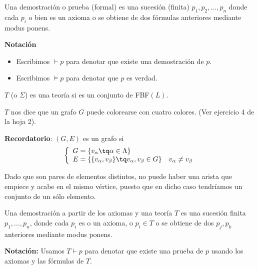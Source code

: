\begin{defn}
	Una demostración o prueba (formal) es una sucesión (finita) $p_1, p_2, \hdots, p_n$ donde cada $p_i$ o bien es un axioma o se obtiene de dos fórmulas anteriores mediante modus ponens.
\end{defn}

\begin{mdframed}
\textbf{Notación}
\begin{itemize}
	\vspace{-3mm}
	\item Escribimos $\vdash p$ para denotar que existe una demostración de $p$.
	\item Escribimos $\vDash p$ para denotar que $p$ es verdad.
\end{itemize}
\end{mdframed}

\begin{defn}[Teoría]
	$T$ (o $\Sigma$) es una teoría si es un conjunto de FBF$(L)$.
\end{defn}
\begin{example}
	$T$ nos dice que un grafo $G$ puede colorearse con cuatro colores. (Ver ejercicio 4 de la hoja 2).
\end{example}

\noindent \textbf{Recordatorio}: $(G,E)$ es un grafo si
\begin{equation*}
	\left\{
	\begin{array}{l l}
	G=\{v_\alpha \tq \alpha \in \Lambda \} & \\
	E = \left\{\{v_\alpha, v_\beta \}\tq v_\alpha, v_\beta\in G \right\} &  v_\alpha \neq v_\beta
	\end{array}
	\right.
\end{equation*}

Dado que son pares de elementos distintos, no puede haber una arista que empiece y acabe en el mismo vértice, puesto que en dicho caso tendríamos un conjunto de un sólo elemento.

\begin{defn}
	Una demostración a partir de los axiomas y una teoría $T$ es una sucesión finita $p_1, \hdots, p_n$, donde cada $p_i$ es o un axioma, o $p_i\in T$ o se obtiene de dos $p_j,p_k$ anteriores mediante modus ponens.
\end{defn}

\begin{mdframed}
\textbf{Notación: } Usamos $T\vdash p$ para denotar que existe una prueba de $p$ usando los axiomas y las fórmulas de $T$.
\end{mdframed}

